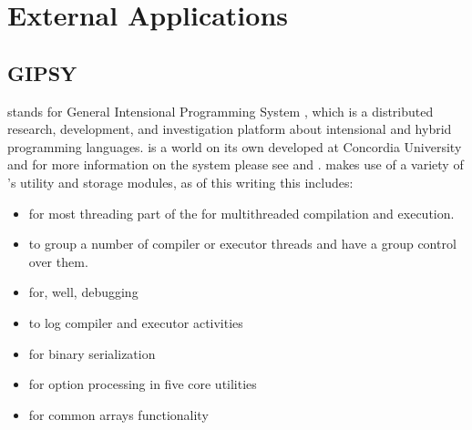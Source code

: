


%
%




%
%




%
%




%
%




%
%




%
%




%
%




%
%

\section{External Applications}

%
%

\subsection{GIPSY}

{\gipsy} stands for General Intensional Programming System \cite{gipsy}, which is
a distributed research, development, and investigation platform about intensional and hybrid
programming languages. {\gipsy} is a world on its own developed at Concordia University and
for more information on the system please see \cite{gipsy} and \cite{mokhovmcthesis05}.
{\gipsy} makes use of a variety of {\marf}'s utility and storage modules, as of this
writing this includes:

\begin{itemize}
\item
	 for most threading part of the {\gipsy} for multithreaded
	compilation and execution.
\item
	 to group a number of compiler or executor threads
	and have a group control over them.
\item
	 for, well, debugging
\item
	 to log compiler and executor activities
\item
	 for binary serialization
\item
	 for option processing in five core {\gipsy} utilities
\item
	 for common arrays functionality
\end{itemize}

